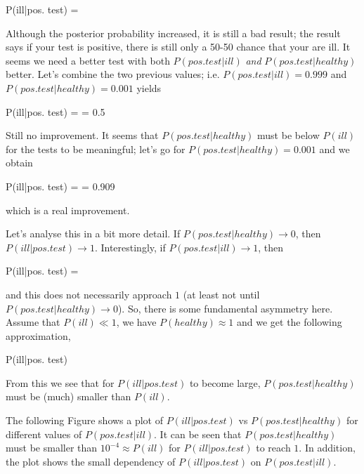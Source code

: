 \bee
P(ill|pos. test) =  
\eee

Although the posterior probability increased, it is still a bad result; the result says if your test is positive, there is still only a 50-50 chance that your are ill. It seems we need a better test with both $P(pos. test | ill)$ \emph{and} $P(pos. test | healthy)$ better. Let's combine the two previous values; i.e. $P(pos. test | ill) = 0.999$ and $P(pos. test | healthy)=0.001$ yields

\bee
P(ill|pos. test) =  = 0.5
\eee

Still no improvement. It seems that $P(pos. test | healthy)$ must be below $P(ill)$ for the tests to be meaningful; let's go for $P(pos. test | healthy) = 0.001$ and we obtain

\bee
P(ill|pos. test) =  = 0.909
\eee

which is a real improvement.

Let's analyse this in a bit more detail. If $P(pos. test | healthy) \rightarrow 0$, then $P(ill|pos. test) \rightarrow 1$. Interestingly, if $P(pos. test | ill) \rightarrow 1$, then

\bee
P(ill|pos. test) = 
\eee

and this does not necessarily approach $1$ (at least not until $P(pos.test|healthy) \rightarrow 0$). So, there is some fundamental asymmetry here. Assume that $P(ill) \ll 1$, we have $P(healthy) \approx 1$ and we get the following approximation,

\bee
P(ill|pos. test) \approx {}
\eee

From this we see that for $P(ill|pos. test)$ to become large, $P(pos.test|healthy)$ must be (much) smaller than $P(ill)$.

The following Figure shows a plot of $P(ill|pos. test)$ vs $P(pos.test|healthy)$ for different values of $P(pos.test|ill)$. It can be seen that $P(pos.test|healthy)$ must be smaller than $10^{-4} \approx P(ill)$ for $P(ill|pos. test)$ to reach $1$. In addition, the plot shows the small dependency of $P(ill|pos. test)$ on $P(pos.test|ill)$.

